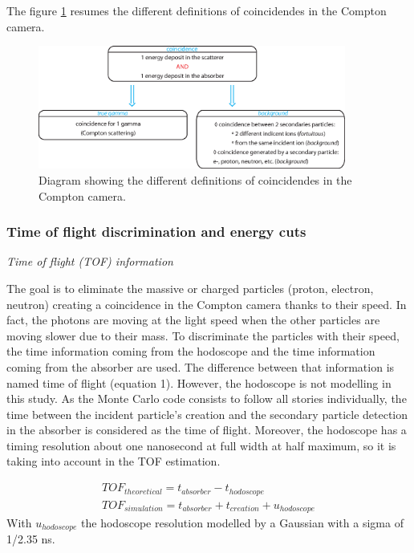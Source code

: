 \documentclass[11pt]{iopart}
\begin{document}
The figure \ref{fig:fig_explication_coincidence_CC_simulation_Hadronth} resumes the different definitions of coincidendes in the Compton camera.
	\begin{figure} [!hbtp]	
	\centering
	\includegraphics[width=0.9\textwidth]{./Figure/Schema_coincidence_EN.eps}
	\caption{Diagram showing the different definitions of coincidendes in the Compton camera.}
	 \label{fig:fig_explication_coincidence_CC_simulation_Hadronth}
	\end{figure}


\subsubsection{Time of flight discrimination and energy cuts}

\textit{Time of flight (TOF) information}\newline

The goal is to eliminate the massive or charged particles (proton, electron, neutron) creating a coincidence in the Compton camera thanks to their speed. In fact, the photons are moving at the light speed when the other particles are moving slower due to their mass. To discriminate the particles with their speed, the time information coming from the hodoscope and the time information coming from the absorber are used. The difference between that information is named time of flight (equation 1). However, the hodoscope is not modelling in this study. As the Monte Carlo code consists to follow all stories individually, the time between the incident particle's creation and the secondary particle detection in the absorber is considered as the time of flight. Moreover, the hodoscope has a timing resolution about one nanosecond at full width at half maximum, so it is taking into account in the TOF estimation.

\begin{eqnarray*}
TOF_{theoretical} = t_{absorber}-t_{hodoscope}\\
TOF_{simulation} = t_{absorber}+t_{creation} + u_{hodoscope}
\end{eqnarray*}
With $u_{hodoscope}$  the hodoscope resolution modelled by a Gaussian with a sigma of 1/2.35 ns. 
\end{document}
